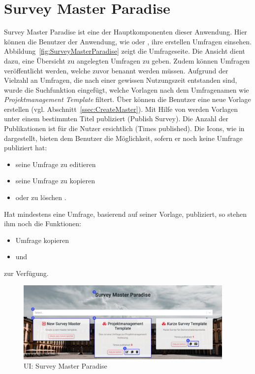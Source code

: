 \section{Survey Master Paradise}
\label{ssec:SurveyMasterParadise}
Survey Master Paradise ist eine der Hauptkomponenten dieser Anwendung.
Hier können die Benutzer der Anwendung, wie \dutzi oder \ariane, ihre erstellen Umfragen einsehen.
Abbildung~\vref{fig:SurveyMasterParadise} zeigt die Umfrageseite. \newline
Die Ansicht dient dazu, eine Übersicht zu angelegten Umfragen zu geben.
Zudem können Umfragen veröffentlicht werden, welche zuvor benannt werden müssen.
Aufgrund der Vielzahl an Umfragen, die nach einer gewissen Nutzungszeit entstanden sind, wurde die Suchfunktion \desTwo eingefügt, welche Vorlagen nach dem Umfragenamen wie \zb \emph{Projektmanagement Template} filtert.
Über \desThree können die Benutzer eine neue Vorlage erstellen (vgl. Abschnitt~\vref{ssec:CreateMaster}). \newline
Mit Hilfe von \desFour werden Vorlagen unter einem bestimmten Titel publiziert (Publish Survey).
Die Anzahl der Publikationen ist für die Nutzer ersichtlich (Times published). \newline
Die Icons, wie in \desFive dargestellt, bieten dem Benutzer die Möglichkeit, sofern er noch keine Umfrage publiziert hat:
%
\begin{itemize}
    \item seine Umfrage zu editieren \faEdit
    \item seine Umfrage zu kopieren \faCopy
    \item oder zu löschen \faTrash.
\end{itemize}
%
Hat \zb \dutzi mindestens eine Umfrage, basierend auf seiner Vorlage, publiziert, so stehen ihm noch die Funktionen:
%
\begin{itemize}
    \item Umfrage kopieren \faCopy
    \item und \faIdCard
\end{itemize}
%
zur Verfügung.
%
\begin{figure}[H]
	\centering
	\includegraphics[width=0.95\textwidth, keepaspectratio]{img/guide/SurveyMasterParadise.png}
	\captionsetup{justification=centering, format=plain}
	\caption[\acl{UI}: Survey Master Paradise]{\acl{UI}: Survey Master Paradise \\\quelleScreenshot}
	\label{fig:SurveyMasterParadise}
\end{figure}
%

